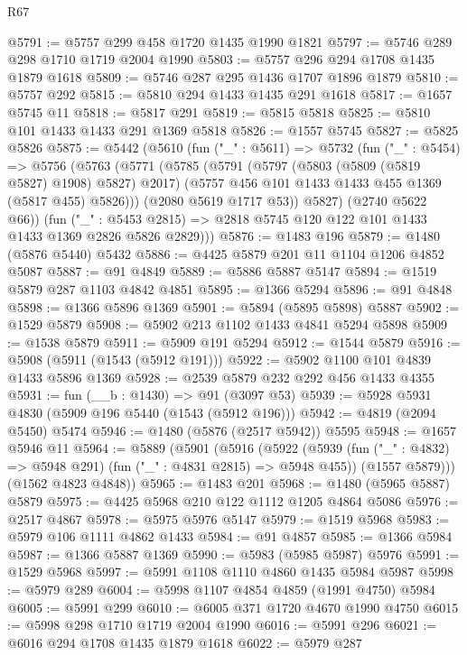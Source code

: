 \begin{lexlean}{R67}
\begin{coremodule}
@5791 := @5757 @299 @458 @1720 @1435 @1990 @1821
@5797 := @5746 @289 @298 @1710 @1719 @2004 @1990
@5803 := @5757 @296 @294 @1708 @1435 @1879 @1618
@5809 := @5746 @287 @295 @1436 @1707 @1896 @1879
@5810 := @5757 @292
@5815 := @5810 @294 @1433 @1435 @291 @1618
@5817 := @1657 @5745 @11
@5818 := @5817 @291
@5819 := @5815 @5818
@5825 := @5810 @101 @1433 @1433 @291 @1369 @5818
@5826 := @1557 @5745
@5827 := @5825 @5826
@5875 := @5442
    (@5610
      (fun ("_" : @5611) =>
      @5732
        (fun ("_" : @5454) =>
        @5756
          (@5763
            (@5771
              (@5785
                (@5791
                  (@5797 (@5803 (@5809 (@5819 @5827) @1908) @5827) @2017)
                  (@5757 @456 @101 @1433 @1433 @455 @1369 (@5817 @455) @5826)))
              (@2080 @5619 @1717 @53))
            @5827)
          (@2740 @5622 @66))
        (fun ("_" : @5453 @2815) =>
        @2818 @5745 @120 @122 @101 @1433 @1433 @1369 @2826 @5826 @2829)))
@5876 := @1483 @196
@5879 := @1480 (@5876 @5440) @5432
@5886 := @4425 @5879 @201 @11 @1104 @1206 @4852 @5087
@5887 := @91 @4849
@5889 := @5886 @5887 @5147
@5894 := @1519 @5879 @287 @1103 @4842 @4851
@5895 := @1366 @5294
@5896 := @91 @4848
@5898 := @1366 @5896 @1369
@5901 := @5894 (@5895 @5898) @5887
@5902 := @1529 @5879
@5908 := @5902 @213 @1102 @1433 @4841 @5294 @5898
@5909 := @1538 @5879
@5911 := @5909 @191 @5294
@5912 := @1544 @5879
@5916 := @5908 (@5911 (@1543 (@5912 @191)))
@5922 := @5902 @1100 @101 @4839 @1433 @5896 @1369
@5928 := @2539 @5879 @232 @292 @456 @1433 @4355
@5931 := fun (__b : @1430) => @91 (@3097 @53)
@5939 := @5928 @5931 @4830 (@5909 @196 @5440 (@1543 (@5912 @196)))
@5942 := @4819 (@2094 @5450) @5474
@5946 := @1480 (@5876 (@2517 @5942)) @5595
@5948 := @1657 @5946 @11
@5964 := @5889
    (@5901
      (@5916
        (@5922
          (@5939 (fun ("_" : @4832) => @5948 @291) (fun ("_" : @4831 @2815) => @5948 @455))
          (@1557 @5879)))
      (@1562 @4823 @4848))
@5965 := @1483 @201
@5968 := @1480 (@5965 @5887) @5879
@5975 := @4425 @5968 @210 @122 @1112 @1205 @4864 @5086
@5976 := @2517 @4867
@5978 := @5975 @5976 @5147
@5979 := @1519 @5968
@5983 := @5979 @106 @1111 @4862 @1433
@5984 := @91 @4857
@5985 := @1366 @5984
@5987 := @1366 @5887 @1369
@5990 := @5983 (@5985 @5987) @5976
@5991 := @1529 @5968
@5997 := @5991 @1108 @1110 @4860 @1435 @5984 @5987
@5998 := @5979 @289
@6004 := @5998 @1107 @4854 @4859 (@1991 @4750) @5984
@6005 := @5991 @299
@6010 := @6005 @371 @1720 @4670 @1990 @4750
@6015 := @5998 @298 @1710 @1719 @2004 @1990
@6016 := @5991 @296
@6021 := @6016 @294 @1708 @1435 @1879 @1618
@6022 := @5979 @287

\end{coremodule}
\end{lexlean}
